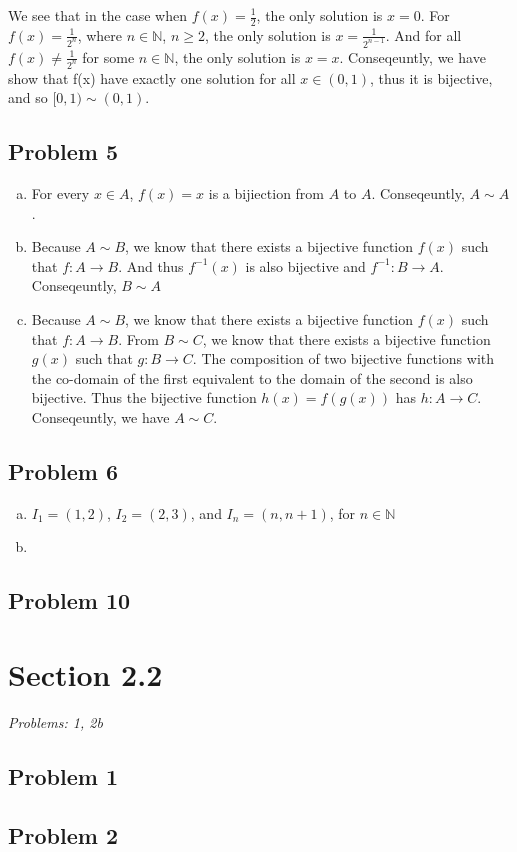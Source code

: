\documentclass[12pt]{article}
\begin{document}
\begin{enumerate}[a).]
{        We see that in the case when $f(x) = \frac{1}{2}$, the only solution is $x = 0$.
        For $f(x) = \frac{1}{2^n}$, where $n \in \mathbb{N}$, $n \ge 2$, the only solution is $x = \frac{1}{2^{n-1}}$. 
        And for all $ f(x) \ne \frac{1}{2^n}$ for some $n \in \mathbb{N}$, the only solution is $x = x$. 
        Conseqeuntly, we have show that f(x) have exactly one solution for all $x \in (0,1)$, thus it is bijective, and so $[0,1) \sim (0,1)$. 
    }

\end{enumerate}


\subsection*{Problem 5}
\begin{enumerate}[a).]
    \item {
        For every $x \in A$, $f(x) = x$ is a bijiection from $A$ to $A$. 
        Conseqeuntly, $A \sim A$. 
    }
    \item {
        Because $A \sim B$, we know that there exists a bijective function $f(x)$ such that $f: A \rightarrow B$. 
        And thus $f^{-1}(x)$ is also bijective and $f^{-1}: B \rightarrow A$. 
        Conseqeuntly, $B \sim A$
    }
    \item {
        Because $A \sim B$, we know that there exists a bijective function $f(x)$ such that $f: A \rightarrow B$. 
        From $B \sim C$, we know that there exists a bijective function $g(x)$ such that $g: B \rightarrow C$. 
        The composition of two bijective functions with the co-domain of the first equivalent to the domain of the second is also bijective. 
        Thus the bijective function $h(x) = f(g(x))$ has $h: A \rightarrow C$. Conseqeuntly, we have $A \sim C$. 

    }
\end{enumerate}


\subsection*{Problem 6}
\begin{enumerate}[a).]
    \item {
    $I_1 = (1, 2)$,
    $I_2 = (2, 3)$,
    and $I_n = (n, n+1)$, for $n \in \mathbb{N}$

    }
    \item {

    }
\end{enumerate}
\subsection*{Problem 10}


\vspace*{1cm}


\section*{Section 2.2}
\textit{Problems: 1, 2b}
\subsection*{Problem 1}
\subsection*{Problem 2}
\end{document}
